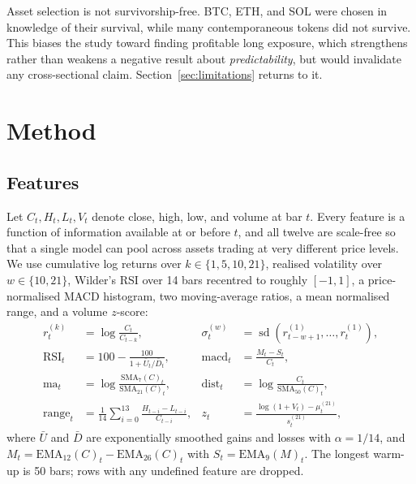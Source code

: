 \documentclass{article}
\theoremstyle{plain}
\theoremstyle{definition}
\begin{document}
\begin{table}[t]
  \centering
  \caption{Evaluated out-of-sample window per setting. Counts are forecasts, not
  trades; the trading rule of Section~\ref{sec:strategy} samples every $h$-th bar.}
  \label{tab:data}
  \small
  
\end{table}

Asset selection is not survivorship-free. BTC, ETH, and SOL were chosen in
knowledge of their survival, while many contemporaneous tokens did not survive.
This biases the study toward finding profitable long exposure, which strengthens
rather than weakens a negative result about \emph{predictability}, but would
invalidate any cross-sectional claim. Section~\ref{sec:limitations} returns to it.

\section{Method}

\subsection{Features}

Let $C_t, H_t, L_t, V_t$ denote close, high, low, and volume at bar $t$. Every
feature is a function of information available at or before $t$, and all twelve
are scale-free so that a single model can pool across assets trading at very
different price levels. We use cumulative log returns over
$k \in \{1,5,10,21\}$, realised volatility over $w \in \{10,21\}$, Wilder's RSI
over 14 bars recentred to roughly $[-1,1]$, a price-normalised MACD histogram,
two moving-average ratios, a mean normalised range, and a volume $z$-score:
%
\begin{align}
  r_t^{(k)} &= \log \frac{C_t}{C_{t-k}},
  &
  \sigma_t^{(w)} &= \operatorname{sd}\!\left(r_{t-w+1}^{(1)}, \dots, r_t^{(1)}\right),
  \\[2pt]
  \mathrm{RSI}_t &= 100 - \frac{100}{1 + \bar{U}_t / \bar{D}_t},
  &
  \mathrm{macd}_t &= \frac{M_t - S_t}{C_t},
  \\[2pt]
  \mathrm{ma}_t &= \log \frac{\mathrm{SMA}_7(C)_t}{\mathrm{SMA}_{21}(C)_t},
  &
  \mathrm{dist}_t &= \log \frac{C_t}{\mathrm{SMA}_{50}(C)_t},
  \\[2pt]
  \mathrm{range}_t &= \frac{1}{14}\sum_{i=0}^{13} \frac{H_{t-i} - L_{t-i}}{C_{t-i}},
  &
  z_t &= \frac{\log(1+V_t) - \mu_t^{(21)}}{s_t^{(21)}},
\end{align}
%
where $\bar U$ and $\bar D$ are exponentially smoothed gains and losses with
$\alpha = 1/14$, and $M_t = \mathrm{EMA}_{12}(C)_t - \mathrm{EMA}_{26}(C)_t$ with
$S_t = \mathrm{EMA}_9(M)_t$. The longest warm-up is 50 bars; rows with any
undefined feature are dropped.
\end{document}
